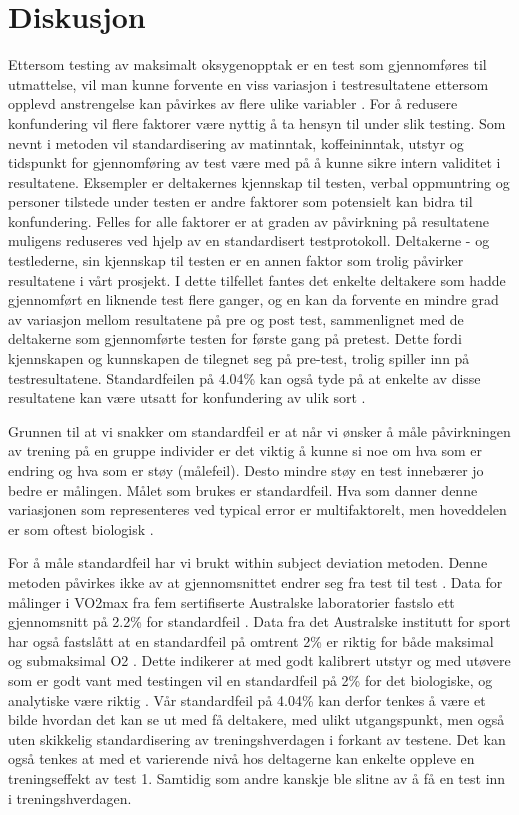 \documentclass[
]{book}
\begin{document}
\hypertarget{diskusjon}{%
\section{Diskusjon}\label{diskusjon}}

Ettersom testing av maksimalt oksygenopptak er en test som gjennomføres til utmattelse, vil man kunne forvente en viss variasjon i testresultatene ettersom opplevd anstrengelse kan påvirkes av flere ulike variabler \citep{halperin2015}. For å redusere konfundering vil flere faktorer være nyttig å ta hensyn til under slik testing. Som nevnt i metoden vil standardisering av matinntak, koffeininntak, utstyr og tidspunkt for gjennomføring av test være med på å kunne sikre intern validitet i resultatene. Eksempler er deltakernes kjennskap til testen, verbal oppmuntring og personer tilstede under testen er andre faktorer som potensielt kan bidra til konfundering. Felles for alle faktorer er at graden av påvirkning på resultatene muligens reduseres ved hjelp av en standardisert testprotokoll. Deltakerne - og testlederne, sin kjennskap til testen er en annen faktor som trolig påvirker resultatene i vårt prosjekt. I dette tilfellet fantes det enkelte deltakere som hadde gjennomført en liknende test flere ganger, og en kan da forvente en mindre grad av variasjon mellom resultatene på pre og post test, sammenlignet med de deltakerne som gjennomførte testen for første gang på pretest. Dette fordi kjennskapen og kunnskapen de tilegnet seg på pre-test, trolig spiller inn på testresultatene. Standardfeilen på 4.04\% kan også tyde på at enkelte av disse resultatene kan være utsatt for konfundering av ulik sort \citep{hopkins2000}.

Grunnen til at vi snakker om standardfeil er at når vi ønsker å måle påvirkningen av trening på en gruppe individer er det viktig å kunne si noe om hva som er endring og hva som er støy (målefeil). Desto mindre støy en test innebærer jo bedre er målingen. Målet som brukes er standardfeil. Hva som danner denne variasjonen som representeres ved typical error er multifaktorelt, men hoveddelen er som oftest biologisk \citep{hopkins2000}.

For å måle standardfeil har vi brukt within subject deviation metoden. Denne metoden påvirkes ikke av at gjennomsnittet endrer seg fra test til test \citep{hopkins2000}. Data for målinger i VO2max fra fem sertifiserte Australske laboratorier fastslo ett gjennomsnitt på 2.2\% for standardfeil \citep{halperin2015}. Data fra det Australske institutt for sport har også fastslått at en standardfeil på omtrent 2\% er riktig for både maksimal og submaksimal O2 \citep{clark2007, robertson2010, saunders2009}. Dette indikerer at med godt kalibrert utstyr og med utøvere som er godt vant med testingen vil en standardfeil på 2\% for det biologiske, og analytiske være riktig \citep{halperin2015}. Vår standardfeil på 4.04\% kan derfor tenkes å være et bilde hvordan det kan se ut med få deltakere, med ulikt utgangspunkt, men også uten skikkelig standardisering av treningshverdagen i forkant av testene. Det kan også tenkes at med et varierende nivå hos deltagerne kan enkelte oppleve en treningseffekt av test 1. Samtidig som andre kanskje ble slitne av å få en test inn i treningshverdagen.
\end{document}
